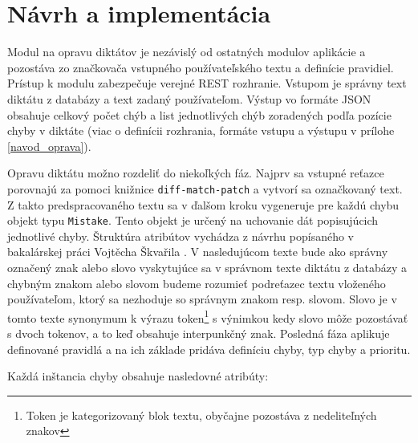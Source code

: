 \documentclass[12pt,oneside]{fithesis2}
\begin{document}
	\section{Návrh a implementácia}
      \par Modul na opravu diktátov je nezávislý od ostatných modulov aplikácie a pozostáva zo značkovača vstupného používateľského textu a definície pravidiel. Prístup k modulu zabezpečuje verejné REST rozhranie. Vstupom je správny text diktátu z databázy a text zadaný používateľom. Výstup vo formáte JSON obsahuje celkový počet chýb a list jednotlivých chýb zoradených podľa pozície chyby v diktáte (viac o definícii rozhrania, formáte vstupu a výstupu v prílohe \ref{navod_oprava}). 
      \par Opravu diktátu možno rozdeliť do niekoľkých fáz. Najprv sa vstupné reťazce porovnajú za pomoci knižnice \texttt{diff-match-patch}\cite{diffmatchpatch} a vytvorí sa označkovaný text. Z takto predspracovaného textu sa v ďalšom kroku vygeneruje pre každú chybu objekt typu \texttt{Mistake}. Tento objekt je určený na uchovanie dát popisujúcich jednotlivé chyby. Štruktúra atribútov vychádza z návrhu popísaného v bakalárskej práci Vojtěcha Škvařila \cite{skvaril14}. V nasledujúcom texte bude ako správny označený znak alebo slovo vyskytujúce sa v správnom texte diktátu z databázy a chybným znakom alebo slovom budeme rozumieť podreťazec textu vloženého používateľom, ktorý sa nezhoduje so správnym znakom resp. slovom. Slovo je v tomto texte synonymum k výrazu token\footnote{Token je kategorizovaný blok textu, obyčajne pozostáva z nedeliteľných znakov} s výnimkou kedy slovo môže pozostávať s dvoch tokenov, a to keď obsahuje interpunkčný znak. Posledná fáza aplikuje definované pravidlá a na ich základe pridáva definíciu chyby, typ chyby a prioritu.
\par Každá inštancia chyby obsahuje nasledovné atribúty:
\end{document}
